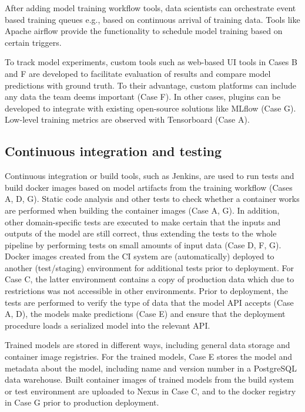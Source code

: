  
After adding model training workflow tools, data scientists can orchestrate event based training queues e.g., based on continuous arrival of training data.  Tools like Apache airflow provide the functionality to schedule model training based on certain triggers. %
 
To track model experiments, custom tools such as web-based UI tools in Cases B and F are developed to facilitate evaluation of results and compare model predictions with ground truth. To their advantage, custom platforms can include any data the team deems important (Case F). In other cases, plugins can be developed to integrate with existing open-source solutions like MLflow (Case G). Low-level training metrics are observed with Tensorboard (Case A).


\subsection{Continuous integration and testing}

Continuous integration or build tools, such as Jenkins, are used to run tests and build docker images based on model artifacts from the training workflow (Cases A, D, G). Static code analysis and other tests to check whether a container works are performed when building the container images (Case A, G). In addition, other domain-specific tests are executed to make certain that the inputs and outputs of the model are still correct, thus extending the tests to the whole pipeline by performing tests on small amounts of input data (Case D, F, G). Docker images created from the CI system are (automatically) deployed to another (test/staging) environment for additional tests prior to deployment. %
For Case C, the latter environment contains a copy of production data which due to restrictions was not accessible in other environments. Prior to deployment, the tests are performed to verify the type of data that the model API accepts (Case A, D), the models make predictions (Case E) and ensure that the deployment procedure loads a serialized model into the relevant API.

Trained models are stored in different ways, including general data storage and container image registries. For the trained models, Case E stores the model and metadata about the model, including name and version number in a PostgreSQL data warehouse. Built container images of trained models from the build system or test environment are uploaded to Nexus in Case C, and to the docker registry in Case G prior to production deployment. 

